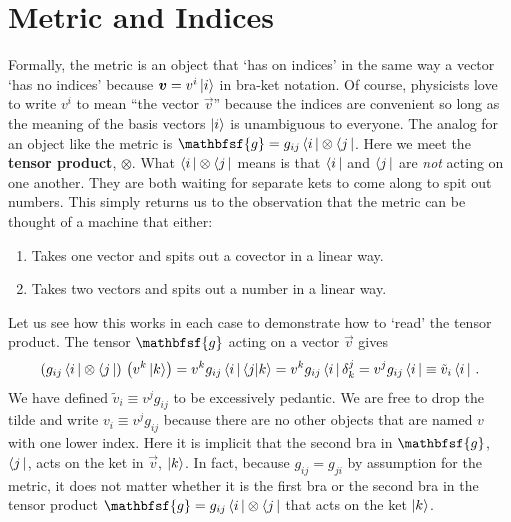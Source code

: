\documentclass[
  11pt,
	colorful,
	raggedright,
]{tufte-style-thesis-flip}
\newcommand{\tens}[1]{\mathbfsf{#1}}
\begin{document}
\section{Metric and Indices}
\label{sec:indices}

Formally, the metric is an object that `has on indices' in the same way a vector `has no indices' because $\boldsymbol{v} = v^i\left|i\right\rangle$ in bra-ket notation. Of course, physicists love to write $v^i$ to mean ``the vector $\vec{v}$'' because the indices are convenient so long as the meaning of the basis vectors $\left|i\right\rangle$ is unambiguous to everyone. The analog for an object like the metric is $\tens{g} = g_{ij}\bra{i}\otimes\bra{j}$. Here we meet the \textbf{tensor product}, $\otimes$. What $\left\langle i\,\right|\otimes\left\langle j\,\right|$ means is that $\left\langle i\,\right|$ and $\left\langle j\,\right|$ are \emph{not} acting on one another. They are both waiting for separate kets to come along to spit out numbers. This simply returns us to the observation that the metric can be thought of a machine that either:
\begin{enumerate}
  \item Takes one vector and spits out a covector in a linear way.
  \item Takes two vectors and spits out a number in a linear way.
\end{enumerate}
Let us see how this works in each case to demonstrate how to `read' the tensor product. The tensor $\tens{g}$ acting on a vector $\vec{v}$ gives
\begin{align}
  \left(g_{ij}\left\langle i\,\right|\otimes\left\langle j\,\right|\right) \, \left(v^k\left|k\right\rangle\right) 
  = v^k g_{ij}\left\langle i\,\right| \langle j | k\rangle 
  = v^k g_{ij}\left\langle i\,\right| \delta^j_k
  = v^j g_{ij}\left\langle i\,\right| 
  \equiv \tilde v_i \left\langle i\,\right| \, .
\end{align}
We have defined $\tilde v_i \equiv v^j g_{ij}$ to be excessively pedantic. We are free to drop the tilde and write $v_i \equiv v^j g_{ij}$ because there are no other objects that are named $v$ with one lower index.
Here it is implicit that the second bra in $\tens{g}$, $\left\langle j\,\right|$, acts on the ket in $\vec{v}$, $\left|k\right\rangle$. In fact, because $g_{ij} = g_{ji}$ by assumption for the metric, it does not matter whether it is the first bra or the second bra in the tensor product $\tens{g} = g_{ij}\bra{i}\otimes\bra{j}$ that acts on the ket $\left|k\right\rangle$. 
\end{document}
